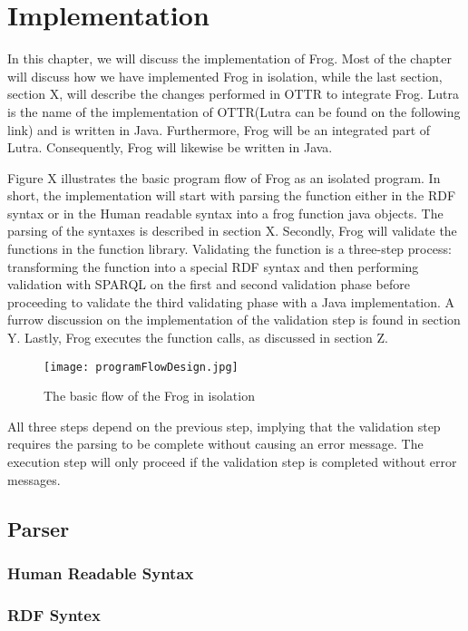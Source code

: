 
\chapter{Implementation}
In this chapter, we will discuss the implementation of Frog. Most of the chapter will discuss how we have implemented Frog in isolation, while the last section, section X, will describe the changes performed in OTTR to integrate Frog. Lutra is the name of the implementation of OTTR(Lutra can be found on the following link) and is written in Java. Furthermore, Frog will be an integrated part of Lutra. Consequently, Frog will likewise be written in Java.

\para
Figure X illustrates the basic program flow of Frog as an isolated program. In short, the implementation will start with parsing the function either in the RDF syntax or in the Human readable syntax into a frog function java objects. The parsing of the syntaxes is described in section X. Secondly, Frog will validate the functions in the function library. Validating the function is a three-step process: transforming the function into a special RDF syntax and then performing validation with SPARQL on the first and second validation phase before proceeding to validate the third validating phase with a Java implementation. A furrow discussion on the implementation of the validation step is found in section Y. Lastly, Frog executes the function calls, as discussed in section Z. 

\begin{figure}
  \centering
  \texttt{[image: programFlowDesign.jpg]}
  \caption{The basic flow of the Frog in isolation}
  \label{fig:basic_program_flow}
\end{figure}
\para
All three steps depend on the previous step, implying that the validation step requires the parsing to be complete without causing an error message. The execution step will only proceed if the validation step is completed without error messages.


\section{Parser}
\label{parser}
\subsection{Human Readable Syntax}
\label{implHRS}
\subsection{RDF Syntex}
\label{implRDF}

